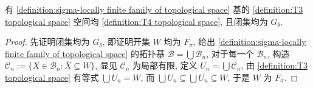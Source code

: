\begin{lemma}
    有 \ref{definition:sigma-locally finite family of topological space} 基的 \ref{definition:T3 topological space} 空间均 \ref{definition:T4 topological space},
    且闭集均为 \(G_\delta\).

    \begin{proof}
        先证明闭集均为 \(G_\delta\), 即证明开集 \(W\) 均为 \(F_\sigma\), 给出 \ref{definition:sigma-locally finite family of topological space} 的拓扑基 \(\mathcal{B} = \bigcup \mathcal{B}_n\),
        对于每一个 \(\mathcal{B}_n\), 构造 \(\mathcal{C}_n := \{X \in \mathcal{B}_n : \overline{X} \subseteq W\}\), 显见 \(\mathcal{C}_n\) 为局部有限, 定义 \(U_n = \bigcup \mathcal{C}_n\),
        由 \ref{definition:T3 topological space} 有等式 \(\bigcup U_n = W\), 而 \(\bigcup U_n \subseteq \bigcup \overline{U_n} \subseteq W\), 于是 \(W\) 为 \(F_\sigma\).
    \end{proof}
\end{lemma}

